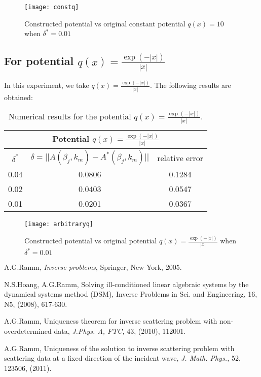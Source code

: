 \documentclass[12pt]{article}
\theoremstyle{plain}
\begin{document}
\begin{figure}[H]
  \texttt{[image: constq]}
  \caption{Constructed potential vs original constant potential $q(x) = 10$ when $\delta^* = 0.01$}
\end{figure}

\subsection{For potential $q(x) = \frac{\exp(-|x|)}{|x|}$}\label{sec4.2}
In this experiment, we take $q(x) = \frac{\exp(-|x|)}{|x|}$. The following results are obtained:
\begin{table}[H]
\begin{center}\begin{tabular}{ccc}
\hline
\multicolumn{3}{c}{Potential $q(x) = \frac{\exp(-|x|)}{|x|}$}\\
\hline
$\delta^*$ & $\delta  = ||A(\beta_j,k_m) - A^*(\beta_j,k_m)||$ & relative error\\
\hline
0.04 & 0.0806 & 0.1284\\
0.02 & 0.0403 & 0.0547\\
0.01 & 0.0201 & 0.0367\\
\hline
\end{tabular} \caption{Numerical results for the potential $q(x) = \frac{\exp(-|x|)}{|x|}$.}\label{tab2}
\end{center}
\end{table}

\begin{figure}[H]
  \texttt{[image: arbitraryq]}
  \caption{Constructed potential vs original potential $q(x) = \frac{\exp(-|x|)}{|x|}$ when $\delta^* = 0.01$}
\end{figure}

\newpage
\begin{thebibliography}{1000} %


 A.G.Ramm, {\em Inverse problems}, Springer, New York, 2005.

 N.S.Hoang, A.G.Ramm, Solving ill-conditioned linear algebraic systems
by the dynamical systems method (DSM),
Inverse Problems in Sci. and Engineering, 16, N5, (2008), 617-630.

 A.G.Ramm,  Uniqueness theorem for inverse scattering problem with
non-overdetermined data, {\em J.Phys. A, FTC,} 43, (2010), 112001.

 A.G.Ramm, Uniqueness of the solution to inverse scattering problem
with scattering data at a fixed direction of the incident wave,
{\em J. Math. Phys.,} 52, 123506, (2011).

\end{thebibliography}
\end{document}
